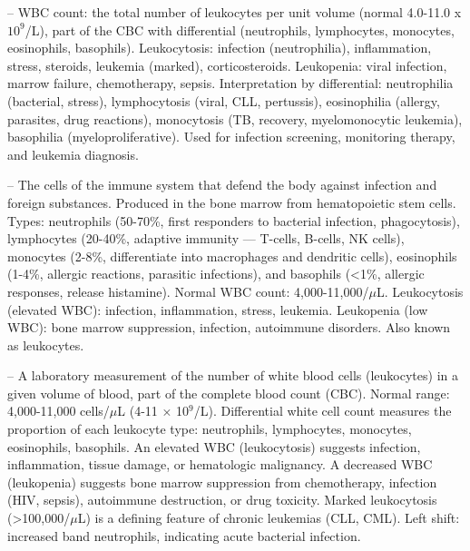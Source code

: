 -- WBC count: the total number of leukocytes per unit volume (normal 4.0-11.0 x $10^9$/L), part of the CBC with differential (neutrophils, lymphocytes, monocytes, eosinophils, basophils). Leukocytosis: infection (neutrophilia), inflammation, stress, steroids, leukemia (marked), corticosteroids. Leukopenia: viral infection, marrow failure, chemotherapy, sepsis. Interpretation by differential: neutrophilia (bacterial, stress), lymphocytosis (viral, CLL, pertussis), eosinophilia (allergy, parasites, drug reactions), monocytosis (TB, recovery, myelomonocytic leukemia), basophilia (myeloproliferative). Used for infection screening, monitoring therapy, and leukemia diagnosis.

-- The cells of the immune system that defend the body against infection and foreign substances. Produced in the bone marrow from hematopoietic stem cells. Types: neutrophils (50-70\%, first responders to bacterial infection, phagocytosis), lymphocytes (20-40\%, adaptive immunity — T-cells, B-cells, NK cells), monocytes (2-8\%, differentiate into macrophages and dendritic cells), eosinophils (1-4\%, allergic reactions, parasitic infections), and basophils (<1\%, allergic responses, release histamine). Normal WBC count: 4,000-11,000/\(\mu\)L. Leukocytosis (elevated WBC): infection, inflammation, stress, leukemia. Leukopenia (low WBC): bone marrow suppression, infection, autoimmune disorders. Also known as leukocytes.

-- A laboratory measurement of the number of white blood cells (leukocytes) in a given volume of blood, part of the complete blood count (CBC). Normal range: 4,000-11,000 cells/\(\mu\)L (4-11 × 10\(^9\)/L). Differential white cell count measures the proportion of each leukocyte type: neutrophils, lymphocytes, monocytes, eosinophils, basophils. An elevated WBC (leukocytosis) suggests infection, inflammation, tissue damage, or hematologic malignancy. A decreased WBC (leukopenia) suggests bone marrow suppression from chemotherapy, infection (HIV, sepsis), autoimmune destruction, or drug toxicity. Marked leukocytosis (>100,000/\(\mu\)L) is a defining feature of chronic leukemias (CLL, CML). Left shift: increased band neutrophils, indicating acute bacterial infection.
